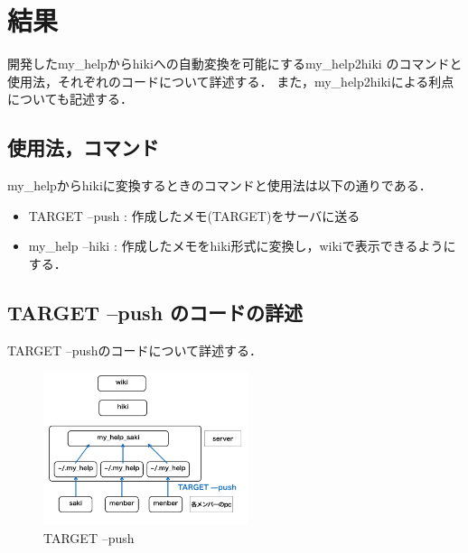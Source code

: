 \section{結果}
開発したmy\_helpからhikiへの自動変換を可能にするmy\_help2hiki
のコマンドと使用法，それぞれのコードについて詳述する．
また，my\_help2hikiによる利点についても記述する．

\subsection{使用法，コマンド}
my\_helpからhikiに変換するときのコマンドと使用法は以下の通りである．
\begin{itemize}
\item TARGET --push : 作成したメモ(TARGET)をサーバに送る
\end{itemize}  
\begin{itemize}
\item my\_help --hiki : 作成したメモをhiki形式に変換し，wikiで表示できるようにする．
\end{itemize}

\subsection{TARGET --push のコードの詳述}
TARGET --pushのコードについて詳述する．
\begin{figure}[htbp]\begin{center}
\includegraphics[width=6cm,bb=100 100 600 700]{my_help2hiki_saki.012.png}
\caption{TARGET --push}
\label{default}\end{center}\end{figure}

